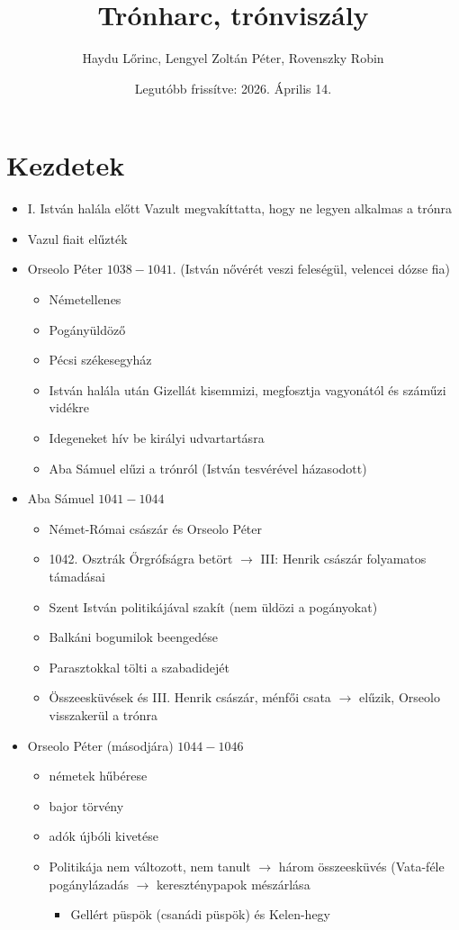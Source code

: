 \documentclass{article}
\title{Trónharc, trónviszály}
\author{Haydu Lőrinc, Lengyel Zoltán Péter, Rovenszky Robin}
\date{Legutóbb frissítve: 2026. Április 14.}
\begin{document}
\maketitle

\section{Kezdetek}
\begin{itemize}
    \item I. István halála előtt Vazult megvakíttatta, hogy ne legyen alkalmas a trónra
    \item Vazul fiait elűzték
    \item Orseolo Péter $1038-1041$. (István nővérét veszi feleségül, velencei dózse fia) 
    \begin{itemize}
        \item Németellenes
        \item Pogányüldöző
        \item Pécsi székesegyház
        \item István halála után Gizellát kisemmizi, megfosztja vagyonától és száműzi vidékre
        \item Idegeneket hív be királyi udvartartásra
        \item Aba Sámuel elűzi a trónról (István tesvérével házasodott)
    \end{itemize}
        
    \item Aba Sámuel $1041-1044$
    \begin{itemize}
        \item Német-Római császár és Orseolo Péter
        \item 1042. Osztrák Őrgrófságra betört $\rightarrow$ III: Henrik császár folyamatos támadásai
        \item Szent István politikájával szakít (nem üldözi a pogányokat)
        \item Balkáni bogumilok beengedése
        \item Parasztokkal tölti a szabadidejét
        \item Összeesküvések és III. Henrik császár, ménfői csata $\rightarrow$ elűzik, Orseolo visszakerül a trónra
    \end{itemize}
    
    \item Orseolo Péter (másodjára) $1044-1046$
    \begin{itemize}
        \item németek hűbérese
        \item bajor törvény 
        \item adók újbóli kivetése
        \item Politikája nem változott, nem tanult $\rightarrow$ három összeesküvés (Vata-féle pogánylázadás $\rightarrow$ kereszténypapok mészárlása 
        \begin{itemize}
            \item Gellért püspök (csanádi püspök) és Kelen-hegy
        \end{itemize}
        

\end{itemize}
\end{itemize}
\end{document}
